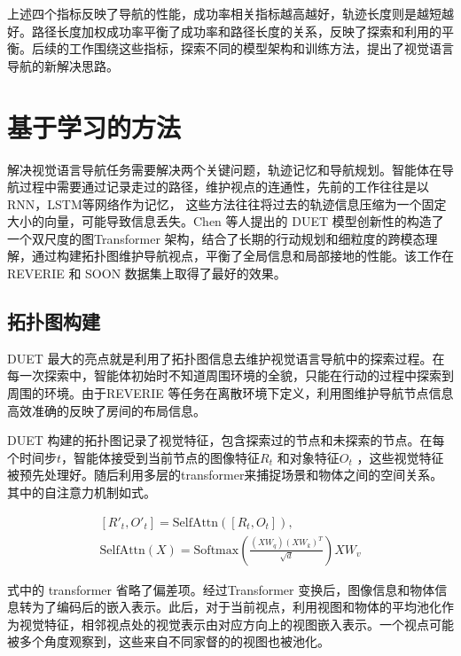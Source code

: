 \documentclass[bachelor]{thesis-uestc}
\begin{document}
上述四个指标反映了导航的性能，成功率相关指标越高越好，轨迹长度则是越短越好。路径长度加权成功率平衡了成功率和路径长度的关系，反映了探索和利用的平衡。后续的工作围绕这些指标，探索不同的模型架构和训练方法，提出了视觉语言导航的新解决思路。

\section{基于学习的方法}

解决视觉语言导航任务需要解决两个关键问题，轨迹记忆和导航规划。智能体在导航过程中需要通过记录走过的路径，维护视点的连通性，先前的工作往往是以RNN，LSTM等网络作为记忆， 这些方法往往将过去的轨迹信息压缩为一个固定大小的向量，可能导致信息丢失。Chen 等人\cite{chenThinkGlobalAct2022}提出的 DUET 模型创新性的构造了一个双尺度的图Transformer 架构，结合了长期的行动规划和细粒度的跨模态理解，通过构建拓扑图维护导航视点，平衡了全局信息和局部接地的性能。该工作在REVERIE 和 SOON 数据集上取得了最好的效果。

\subsection{拓扑图构建}


DUET 最大的亮点就是利用了拓扑图信息去维护视觉语言导航中的探索过程。在每一次探索中，智能体初始时不知道周围环境的全貌，只能在行动的过程中探索到周围的环境。由于REVERIE 等任务在离散环境下定义，利用图维护导航节点信息高效准确的反映了房间的布局信息。

DUET 构建的拓扑图记录了视觉特征，包含探索过的节点和未探索的节点。在每个时间步$t$，智能体接受到当前节点的图像特征$R_t$ 和对象特征$O_t$ ，这些视觉特征被预先处理好。随后利用多层的transformer来捕捉场景和物体之间的空间关系。其中的自注意力机制如式。

\begin{equation}
    \begin{aligned}
    [R'_{t}, O'_{t}] = \text{SelfAttn}([R_{t}, O_{t}]), \\
    \text{SelfAttn}(X) = \text{Softmax}\left( \frac{(XW_{q})(XW_{k})^{T}}{\sqrt{d}} \right) XW_{v}
    \end{aligned}
\label{SelfAttn}
\end{equation}

式中的 transformer 省略了偏差项。经过Transformer 变换后，图像信息和物体信息转为了编码后的嵌入表示。此后，对于当前视点，利用视图和物体的平均池化作为视觉特征，相邻视点处的视觉表示由对应方向上的视图嵌入表示。一个视点可能被多个角度观察到，这些来自不同家督的的视图也被池化。
\end{document}
